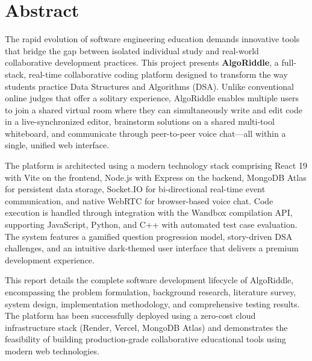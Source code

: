 \chapter*{Abstract}

The rapid evolution of software engineering education demands innovative tools that bridge the gap between isolated individual study and real-world collaborative development practices. This project presents \textbf{AlgoRiddle}, a full-stack, real-time collaborative coding platform designed to transform the way students practice Data Structures and Algorithms (DSA). Unlike conventional online judges that offer a solitary experience, AlgoRiddle enables multiple users to join a shared virtual room where they can simultaneously write and edit code in a live-synchronized editor, brainstorm solutions on a shared multi-tool whiteboard, and communicate through peer-to-peer voice chat---all within a single, unified web interface.

The platform is architected using a modern technology stack comprising React 19 with Vite on the frontend, Node.js with Express on the backend, MongoDB Atlas for persistent data storage, Socket.IO for bi-directional real-time event communication, and native WebRTC for browser-based voice chat. Code execution is handled through integration with the Wandbox compilation API, supporting JavaScript, Python, and C++ with automated test case evaluation. The system features a gamified question progression model, story-driven DSA challenges, and an intuitive dark-themed user interface that delivers a premium development experience.

This report details the complete software development lifecycle of AlgoRiddle, encompassing the problem formulation, background research, literature survey, system design, implementation methodology, and comprehensive testing results. The platform has been successfully deployed using a zero-cost cloud infrastructure stack (Render, Vercel, MongoDB Atlas) and demonstrates the feasibility of building production-grade collaborative educational tools using modern web technologies.

\clearpage
